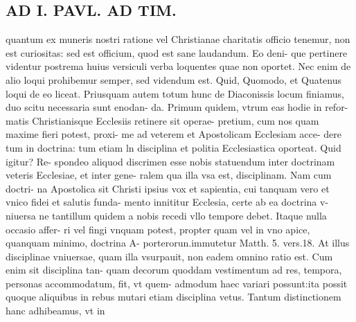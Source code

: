 \documentclass{article}
\begin{document}
\begin{pages}
\section*{AD I. PAVL. AD TIM. }
\marginpar{[ p.286 ]}\pstart quantum ex muneris nostri ratione vel Christianae charitatis officio tenemur, non est curiositas: sed est officium, quod est sane laudandum. Eo deni- que pertinere videntur postrema huius versiculi verba loquentes quae non oportet. Nec enim de alio loqui prohibemur semper, sed videndum est. Quid, Quomodo, et Quatenus loqui de eo liceat. Priusquam autem totum hunc de Diaconissis locum finiamus, duo scitu necessaria sunt enodan- da. Primum quidem, vtrum eas hodie in refor- matis Christianisque Ecclesiis retinere sit operae- pretium, cum nos quam maxime fieri potest, proxi- me ad veterem et Apostolicam Ecclesiam acce- dere tum in doctrina: tum etiam ln disciplina et politia Ecclesiastica oporteat. Quid igitur? Re- spondeo aliquod discrimen esse nobis statuendum inter doctrinam veteris Ecclesiae, et inter gene- ralem qua illa vsa est, disciplinam. Nam cum doctri- na Apostolica sit Christi ipsius vox et sapientia, cui tanquam vero et vnico fidei et salutis funda- mento innititur Ecclesia, certe ab ea doctrina v- niuersa ne tantillum quidem a nobis recedi vllo tempore debet. Itaque nulla occasio affer- ri vel fingi vnquam potest, propter quam vel in vno apice, quanquam minimo, doctrina A- porterorun.immutetur Matth. 5. vers.18. At illus disciplinae vniuersae, quam illa vsurpauit, non eadem omnino ratio est. Cum enim sit disciplina tan- quam decorum quoddam vestimentum ad res, tempora, personas accommodatum, fit, vt quem- admodum haec variari possunt:ita possit quoque aliquibus in rebus mutari etiam disciplina vetus. Tantum distinctionem hanc adhibeamus, vt in  \pend

\end{pages}
\end{document}
